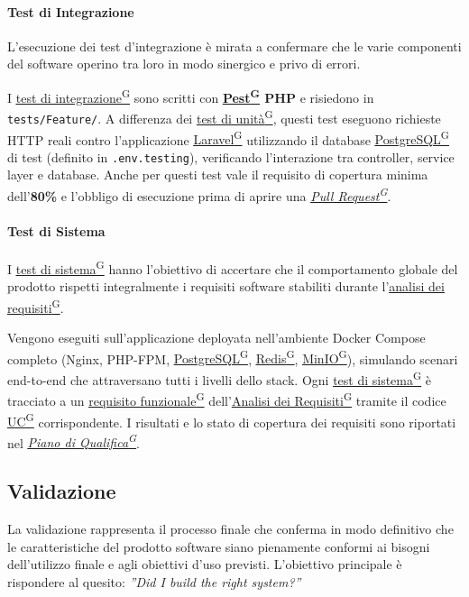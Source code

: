 \documentclass[a4paper,12pt]{article}
\providecommand{\glslink}[2]{\href{https://alittlebyte-19.github.io/Documentazione/glossario.html\#gls-#1}{\underline{#2}\textsuperscript{\scriptsize G}}}
\begin{document}
\paragraph{Test di Integrazione}
L'esecuzione dei test d'integrazione è mirata a confermare che le varie componenti del software operino tra loro in modo sinergico e privo di errori.

I \glslink{test-di-integrazione}{test di integrazione} sono scritti con \textbf{\glslink{pest}{Pest} PHP} e risiedono in \texttt{tests/Feature/}. A differenza dei \glslink{test-di-unita}{test di unità}, questi test eseguono richieste HTTP reali contro l'applicazione \glslink{laravel}{Laravel} utilizzando il database \glslink{postgresql}{PostgreSQL} di test (definito in \texttt{.env.testing}), verificando l'interazione tra controller, service layer e database. Anche per questi test vale il requisito di copertura minima dell'\textbf{80\%} e l'obbligo di esecuzione prima di aprire una \textit{\glslink{pull-request}{Pull Request}}.

\paragraph{Test di Sistema}
I \glslink{test-di-sistema}{test di sistema} hanno l'obiettivo di accertare che il comportamento globale del prodotto rispetti integralmente i requisiti software stabiliti durante l'\glslink{analisi-dei-requisiti-adr}{analisi dei requisiti}.

Vengono eseguiti sull'applicazione deployata nell'ambiente Docker Compose completo (Nginx, PHP-FPM, \glslink{postgresql}{PostgreSQL}, \glslink{redis}{Redis}, \glslink{minio}{MinIO}), simulando scenari end-to-end che attraversano tutti i livelli dello stack. Ogni \glslink{test-di-sistema}{test di sistema} è tracciato a un \glslink{requisito-funzionale}{requisito funzionale} dell'\glslink{analisi-dei-requisiti-adr}{Analisi dei Requisiti} tramite il codice \glslink{caso-d-uso-uc}{UC} corrispondente. I risultati e lo stato di copertura dei requisiti sono riportati nel \textit{\glslink{piano-di-qualifica}{Piano di Qualifica}}.

\subsection{Validazione}
La validazione rappresenta il processo finale che conferma in modo definitivo che le caratteristiche del prodotto software siano pienamente conformi ai bisogni dell'utilizzo finale e agli obiettivi d'uso previsti. L'obiettivo principale è rispondere al quesito: \textit{''Did I build the right system?''} 
\end{document}
